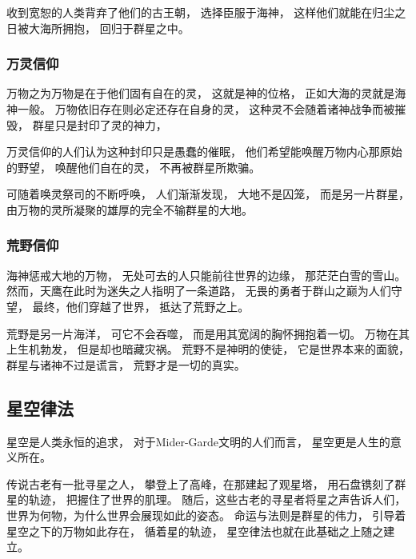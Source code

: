 \documentclass[UTF8,12pt,draft]{ctexbook}
\begin{document}
                    收到宽恕的人类背弃了他们的古王朝，
                    选择臣服于海神，
                    这样他们就能在归尘之日被大海所拥抱，
                    回归于群星之中。
                \subsubsection{万灵信仰}
                    万物之为万物是在于他们固有自在的灵，
                    这就是神的位格，
                    正如大海的灵就是海神一般。
                    万物依旧存在则必定还存在自身的灵，
                    这种灵不会随着诸神战争而被摧毁，
                    群星只是封印了灵的神力，

                    万灵信仰的人们认为这种封印只是愚蠢的催眠，
                    他们希望能唤醒万物内心那原始的野望，
                    唤醒他们自在的灵，
                    不再被群星所欺骗。

                    可随着唤灵祭司的不断呼唤，
                    人们渐渐发现，
                    大地不是囚笼，
                    而是另一片群星，
                    由万物的灵所凝聚的雄厚的完全不输群星的大地。
                \subsubsection{荒野信仰}
                    海神惩戒大地的万物，
                    无处可去的人只能前往世界的边缘，
                    那茫茫白雪的雪山。
                    然而，天鹰在此时为迷失之人指明了一条道路，
                    无畏的勇者于群山之巅为人们守望，
                    最终，他们穿越了世界，
                    抵达了荒野之上。
                    
                    荒野是另一片海洋，
                    可它不会吞噬，
                    而是用其宽阔的胸怀拥抱着一切。
                    万物在其上生机勃发，
                    但是却也暗藏灾祸。
                    荒野不是神明的使徒，
                    它是世界本来的面貌，
                    群星与诸神不过是谎言，
                    荒野才是一切的真实。
            \subsection{星空律法}
                星空是人类永恒的追求，
                对于Mider-Garde文明的人们而言，
                星空更是人生的意义所在。

                传说古老有一批寻星之人，
                攀登上了高峰，在那建起了观星塔，
                用石盘镌刻了群星的轨迹，
                把握住了世界的肌理。
                随后，这些古老的寻星者将星之声告诉人们，
                世界为何物，为什么世界会展现如此的姿态。
                命运与法则是群星的伟力，
                引导着星空之下的万物如此存在，
                循着星的轨迹，
                星空律法也就在此基础之上随之建立。
\end{document}
